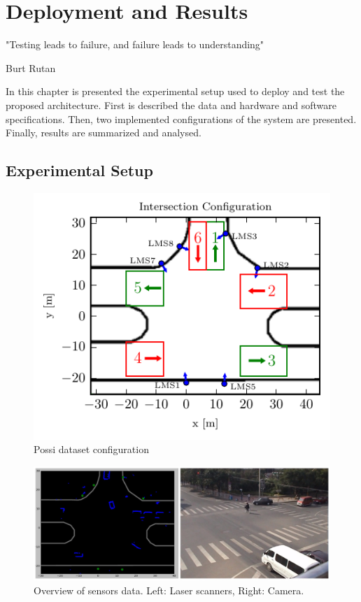 \chapter [Deployment and Results]{Deployment and Results}

\epigraph{"Testing leads to failure, and failure leads to understanding"}{Burt Rutan}

In this chapter is presented the experimental setup used to deploy and test the proposed architecture. First is described the data and hardware and software specifications. Then, two implemented configurations of the system are presented. Finally, results are summarized and analysed.

\section{Experimental Setup}

\begin{figure}[ht!]
\centering
\includegraphics[scale=0.8]{fig/4/intersection-config2.pdf}
\caption{Possi dataset configuration}
\label{possi_img}
\end{figure}

\begin{figure}[ht!]
\centering
\includegraphics[scale=0.2]{fig/4/sensors_overview.jpeg}
\caption{Overview of sensors data. Left: Laser scanners, Right: Camera.}
\label{possi_sensors}
\end{figure}

